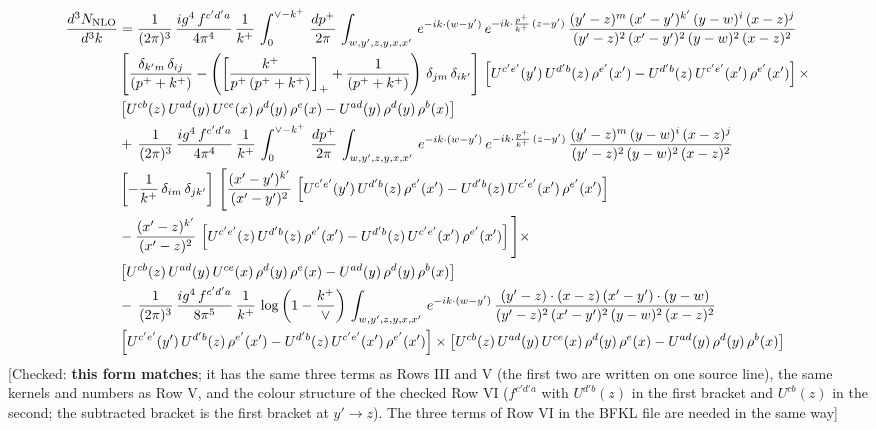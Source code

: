 \documentclass[9pt]{article}
\numberwithin{equation}{section}
\begin{document}
\begin{align}
    \frac{d^{3}N_{\rm NLO}}{d^{3}k} & =  \frac{1}{(2\pi)^{3}}\, \frac{ig^{4}\,f^{c'd'a}}{4\pi^{4}}\, \frac{1}{k^{+}}\,\int_{0}^{\vee-k^{+}}\, \frac{dp^{+}}{2\pi}\, \int_{w,y',z,y,x,x'}\, e^{-ik\cdot (w-y')}\, e^{-ik\cdot \frac{p^{+}}{k^{+}}\,(z-y')}\,\frac{(y'-z)^{m}\,(x'-y')^{k'}\,(y-w)^{i}\,(x-z)^{j}}{(y'-z)^{2}\,(x'-y')^{2}\,(y-w)^{2}\,(x-z)^{2}}\notag \\ & \left[\frac{\delta_{k'm}\,\delta_{ij}}{(p^{+}+k^{+})}-\left(\left[\frac{k^{+}}{p^{+}\,(p^{+}+k^{+})}\right]_{+}+\frac{1}{(p^{+}+k^{+})}\right)\,\delta_{jm}\,\delta_{ik'}\right]\, \left[U^{c'e'}(y')\,U^{d'b}(z)\,\rho^{e'}(x')-U^{d'b}(z)\,U^{c'e'}(x')\,\rho^{e'}(x')\right]\times\notag \\ &  \left[U^{cb}(z)\,U^{ad}(y)\,U^{ce}(x)\,\rho^{d}(y)\,\rho^{e}(x)-U^{ad}(y)\,\rho^{d}(y)\,\rho^{b}(x)\right] \notag \\ &  +\,\frac{1}{(2\pi)^{3}}\, \frac{ig^{4}\,f^{c'd'a}}{4\pi^{4}}\, \frac{1}{k^{+}}\,\int_{0}^{\vee-k^{+}}\, \frac{dp^{+}}{2\pi}\, \int_{w,y',z,y,x,x'}\, e^{-ik\cdot (w-y')}\, e^{-ik\cdot \frac{p^{+}}{k^{+}}\,(z-y')}\,\frac{(y'-z)^{m}\,(y-w)^{i}\,(x-z)^{j}}{(y'-z)^{2}\,(y-w)^{2}\,(x-z)^{2}}\notag \\ &  \left[-\frac{1}{k^{+}}\, \delta_{im}\, \delta_{jk'}\right]\, \Bigg[\frac{(x'-y')^{k'}}{(x'-y')^{2}}\,\left[U^{c'e'}(y')\,U^{d'b}(z)\,\rho^{e'}(x')-U^{d'b}(z)\,U^{c'e'}(x')\,\rho^{e'}(x')\right]\notag \\ & -\frac{(x'-z)^{k'}}{(x'-z)^{2}}\,\left[U^{c'e'}(z)\,U^{d'b}(z)\,\rho^{e'}(x')-U^{d'b}(z)\,U^{c'e'}(x')\,\rho^{e'}(x')\right]\Bigg]\times\notag \\ &    \left[U^{cb}(z)\,U^{ad}(y)\,U^{ce}(x)\,\rho^{d}(y)\,\rho^{e}(x)-U^{ad}(y)\,\rho^{d}(y)\,\rho^{b}(x)\right] \notag \\
&  -\,\frac{1}{(2\pi)^{3}}\, \frac{ig^{4}\,f^{c'd'a}}{8\pi^{5}}\, \frac{1}{k^{+}}\,\log{\left(1-\frac{k^{+}}{\vee}\right)}\, \int_{w,y',z,y,x,x'}\, e^{-ik\cdot (w-y')}\,\frac{(y'-z)\cdot (x-z)\,(x'-y')\cdot (y-w)}{(y'-z)^{2}\,(x'-y')^{2}\,(y-w)^{2}\,(x-z)^{2}}\notag \\ & \left[U^{c'e'}(y')\,U^{d'b}(z)\,\rho^{e'}(x')-U^{d'b}(z)\,U^{c'e'}(x')\,\rho^{e'}(x')\right]\times  \left[U^{cb}(z)\,U^{ad}(y)\,U^{ce}(x)\,\rho^{d}(y)\,\rho^{e}(x)-U^{ad}(y)\,\rho^{d}(y)\,\rho^{b}(x)\right]
\end{align} {\color{red}[Checked: \textbf{this form matches}; it has the same three terms as Rows III and V (the first two are written on one source line), the same kernels and numbers as Row V, and the colour structure of the checked Row VI ($f^{c'd'a}$ with $U^{d'b}(z)$ in the first bracket and $U^{cb}(z)$ in the second; the subtracted bracket is the first bracket at $y'\to z$). The three terms of Row VI in the BFKL file are needed in the same way]}\par\noindent
\end{document}
